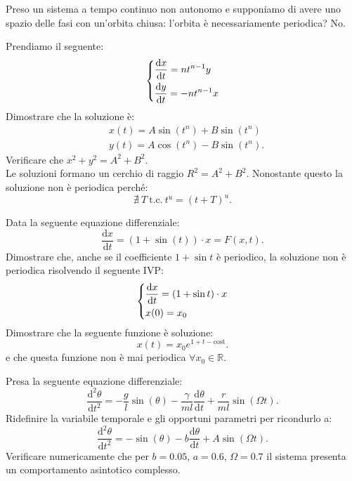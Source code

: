 \noindent
Preso un sistema a tempo continuo non autonomo e supponiamo di avere uno spazio delle fasi con un'orbita chiusa: l'orbita è necessariamente periodica? No.
\begin{ex}
    Prendiamo il seguente:
    \[
        \begin{dcases}
            \frac{\text{d} x}{\text{d} t} = nt^{n-1}y\\
	    \frac{\text{d} y}{\text{d} t}  = -nt^{n-1}x
        \end{dcases}
    \] 
    Dimostrare che la soluzione è:
    \[\begin{aligned}
	&x(t) = A\sin (t^n) + B\sin (t^n)\\
	&y(t) = A\cos (t^n) - B\sin (t^n)
    .\end{aligned}\]
    Verificare che $x^2+y^2 = A^2+B^2$.\\
    Le soluzioni formano un cerchio di raggio $R^2 = A^2+B^2$. Nonostante questo la soluzione non è periodica perché:
    \[
	\nexists \ T \ \text{t.c.} \ t^{u} = (t + T)^u
    .\] 
\end{ex}
\noindent
\begin{ex}
    Data la seguente equazione differenziale:
    \[
	\frac{\text{d} x}{\text{d} t} = (1+\sin (t))\cdot x = F(x,t)
    .\] 
    Dimostrare che, anche se il coefficiente $1+\sin t$ è periodico, la soluzione non è periodica risolvendo il seguente IVP:
    \[
        \begin{dcases}
	    \frac{\text{d} x}{\text{d} t} = (1+\sin t)\cdot x\\
	    x(0) = x_0
        \end{dcases}
    \] 
    Dimostrare che la seguente funzione è soluzione:
    \[
	x(t) = x_0e^{1+t-\text{cost}}
    .\] 
    e che questa funzione non è mai periodica $\forall x_0 \in \mathbb{R}$.
\end{ex}
\noindent
\begin{ex}
    Presa la seguente equazione differenziale:
    \[
	\frac{\text{d} ^2\theta}{\text{d} t^2} = - \frac{g}{l}\sin (\theta) - \frac{\gamma}{ml}\frac{\text{d} \theta}{\text{d} t} + \frac{r}{ml}\sin (\Omega  t)
    .\] 
    Ridefinire la variabile temporale e gli opportuni parametri per ricondurlo a:
    \[
	\frac{\text{d} ^2\theta}{\text{d} t^2} = - \sin (\theta) - b \frac{\text{d} \theta}{\text{d} t} + A\sin (\Omega  t)
    .\] 
    Verificare numericamente che per $b=0.05$, $a = 0.6$, $\Omega  = 0.7$ il sistema presenta un comportamento asintotico complesso.
\end{ex}

